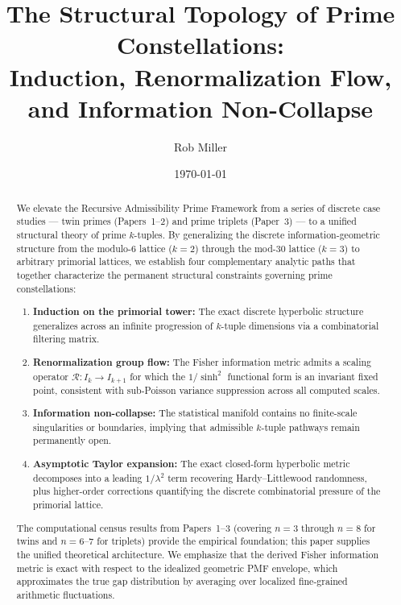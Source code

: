 \documentclass[11pt]{article}
\title{The Structural Topology of Prime Constellations:\\ Induction, Renormalization Flow, and Information Non-Collapse}
\author{Rob Miller}
\date{\today}
\theoremstyle{remark}
\begin{document}
\maketitle

\begin{abstract}
We elevate the Recursive Admissibility Prime Framework from a
series of discrete case studies --- twin primes (Papers~1--2) and
prime triplets (Paper~3) --- to a unified structural theory of
prime $k$-tuples. By generalizing the discrete information-geometric
structure from the modulo-6 lattice ($k=2$) through the mod-30 lattice
($k=3$) to arbitrary primorial lattices, we establish four complementary
analytic paths that together characterize the permanent structural
constraints governing prime constellations:

\begin{enumerate}
    \item \textbf{Induction on the primorial tower:} The exact discrete
    hyperbolic structure generalizes across an infinite progression of
    $k$-tuple dimensions via a combinatorial filtering matrix.
    \item \textbf{Renormalization group flow:} The Fisher information
    metric admits a scaling operator $\mathcal{R}: I_k \to I_{k+1}$
    for which the $1/\sinh^2$ functional form is an invariant fixed
    point, consistent with sub-Poisson variance suppression across
    all computed scales.
    \item \textbf{Information non-collapse:} The statistical manifold
    contains no finite-scale singularities or boundaries, implying
    that admissible $k$-tuple pathways remain permanently open.
    \item \textbf{Asymptotic Taylor expansion:} The exact closed-form
    hyperbolic metric decomposes into a leading $1/\lambda^2$ term
    recovering Hardy--Littlewood randomness, plus higher-order
    corrections quantifying the discrete combinatorial pressure
    of the primorial lattice.
\end{enumerate}

The computational census results from Papers~1--3 (covering $n=3$
through $n=8$ for twins and $n=6$--$7$ for triplets) provide the
empirical foundation; this paper supplies the unified theoretical
architecture. We emphasize that the derived Fisher information metric
is exact with respect to the idealized geometric PMF envelope, which
approximates the true gap distribution by averaging over localized
fine-grained arithmetic fluctuations.
\end{abstract}
\end{document}
